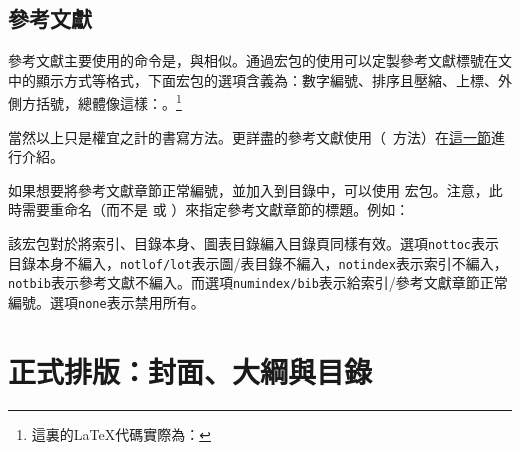 \subsection{參考文獻}
\label{subsec:cite}
參考文獻主要使用的命令是，與相似。通過宏包的使用可以定製參考文獻標號在文中的顯示方式等格式，下面宏包的選項含義為：數字編號、排序且壓縮、上標、外側方括號，總體像這樣：\textsuperscript{\ttfamily [1,3-5]}。\footnote{這裏的LaTeX代碼實際為：}

當然以上只是權宜之計的書寫方法。更詳盡的參考文獻使用（\bibtex\ 方法）在\hyperref[sec:bibtex]{\bibtex{}這一節}進行介紹。

如果想要將參考文獻章節正常編號，並加入到目錄中，可以使用  宏包\label{pkg:tocbibind}。注意，此時需要重命名（而不是  或 ）來指定參考文獻章節的標題。例如：
\begin{latex}
\usepackage[nottoc,numbib]{tocbibind}
\renewcommand{\tocbibname}{References}
\end{latex}

該宏包對於將索引、目錄本身、圖表目錄編入目錄頁同樣有效。選項\texttt{nottoc}表示目錄本身不編入，\texttt{notlof/lot}表示圖/表目錄不編入，\texttt{notindex}表示索引不編入，\texttt{notbib}表示參考文獻不編入。而選項\texttt{numindex/bib}表示給索引/參考文獻章節正常編號。選項\texttt{none}表示禁用所有。

\section{正式排版：封面、大綱與目錄}

